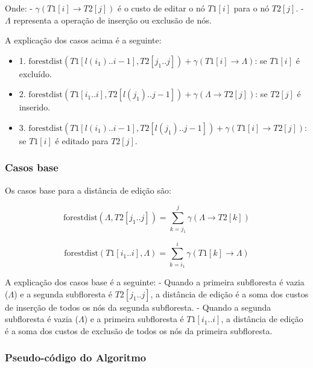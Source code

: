 \documentclass[12pt]{article}
\begin{document}
Onde:
- \( \gamma(T1[i] \to T2[j]) \) é o custo de editar o nó \( T1[i] \) para o nó \( T2[j] \).
- \( \Lambda \) representa a operação de inserção ou exclusão de nós.

A explicação dos casos acima é a seguinte:
\begin{itemize}
    \item 1. \( \text{forestdist}(T1[l(i_1)..i-1], T2[j_1..j]) + \gamma(T1[i] \to \Lambda) \): se \( T1[i] \) é excluído.
    \item 2. \( \text{forestdist}(T1[i_1..i], T2[l(j_1)..j-1]) + \gamma(\Lambda \to T2[j]) \): se \( T2[j] \) é inserido.
    \item 3. \( \text{forestdist}(T1[l(i_1)..i-1], T2[l(j_1)..j-1]) + \gamma(T1[i] \to T2[j]) \): se \( T1[i] \) é editado para \( T2[j] \).

\end{itemize}
\subsubsection{Casos base}

Os casos base para a distância de edição são:

\[
\text{forestdist}(\Lambda, T2[j_1..j]) = \sum_{k=j_1}^{j} \gamma(\Lambda \to T2[k])
\]

\[
\text{forestdist}(T1[i_1..i], \Lambda) = \sum_{k=i_1}^{i} \gamma(T1[k] \to \Lambda)
\]

A explicação dos casos base é a seguinte:
- Quando a primeira subfloresta é vazia (\( \Lambda \)) e a segunda subfloresta é \( T2[j_1..j] \), a distância de edição é a soma dos custos de inserção de todos os nós da segunda subfloresta.
- Quando a segunda subfloresta é vazia (\( \Lambda \)) e a primeira subfloresta é \( T1[i_1..i] \), a distância de edição é a soma dos custos de exclusão de todos os nós da primeira subfloresta.

\subsubsection{Pseudo-código do Algoritmo}
\end{document}
